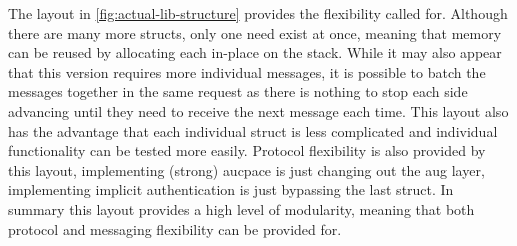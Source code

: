 The layout in \cref{fig:actual-lib-structure} provides the flexibility called for.
Although there are many more structs, only one need exist at once, meaning that memory can be reused by allocating each in-place on the stack.
While it may also appear that this version requires more individual messages, it is possible to batch the messages together in the same request as there is nothing to stop each side advancing until they need to receive the next message each time.
This layout also has the advantage that each individual struct is less complicated and individual functionality can be tested more easily.
Protocol flexibility is also provided by this layout, implementing (strong) \gls{aucpace} is just changing out the aug layer, implementing implicit authentication is just bypassing the last struct.
In summary this layout provides a high level of modularity, meaning that both protocol and messaging flexibility can be provided for.

